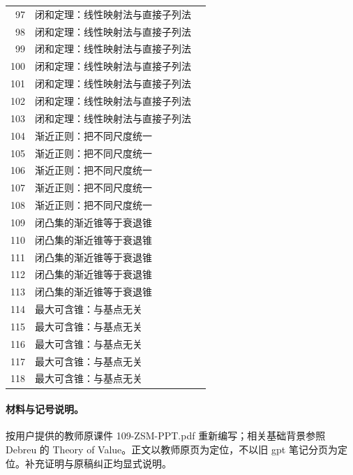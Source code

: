 \documentclass[11pt,a4paper]{article}
\theoremstyle{definition}\newtheorem{definition}{定义}\newtheorem{example}{例}
\begin{document}
\begin{longtable}{r p{.66\linewidth} r}
97 & 闭和定理：线性映射法与直接子列法 & \pageref{g:109:97}\\

98 & 闭和定理：线性映射法与直接子列法 & \pageref{g:109:97}\\

99 & 闭和定理：线性映射法与直接子列法 & \pageref{g:109:97}\\

100 & 闭和定理：线性映射法与直接子列法 & \pageref{g:109:97}\\

101 & 闭和定理：线性映射法与直接子列法 & \pageref{g:109:97}\\

102 & 闭和定理：线性映射法与直接子列法 & \pageref{g:109:97}\\

103 & 闭和定理：线性映射法与直接子列法 & \pageref{g:109:97}\\

104 & 渐近正则：把不同尺度统一 & \pageref{g:109:104}\\

105 & 渐近正则：把不同尺度统一 & \pageref{g:109:104}\\

106 & 渐近正则：把不同尺度统一 & \pageref{g:109:104}\\

107 & 渐近正则：把不同尺度统一 & \pageref{g:109:104}\\

108 & 渐近正则：把不同尺度统一 & \pageref{g:109:104}\\

109 & 闭凸集的渐近锥等于衰退锥 & \pageref{g:109:109}\\

110 & 闭凸集的渐近锥等于衰退锥 & \pageref{g:109:109}\\

111 & 闭凸集的渐近锥等于衰退锥 & \pageref{g:109:109}\\

112 & 闭凸集的渐近锥等于衰退锥 & \pageref{g:109:109}\\

113 & 闭凸集的渐近锥等于衰退锥 & \pageref{g:109:109}\\

114 & 最大可含锥：与基点无关 & \pageref{g:109:114}\\

115 & 最大可含锥：与基点无关 & \pageref{g:109:114}\\

116 & 最大可含锥：与基点无关 & \pageref{g:109:114}\\

117 & 最大可含锥：与基点无关 & \pageref{g:109:114}\\

118 & 最大可含锥：与基点无关 & \pageref{g:109:114}\\

\bottomrule\end{longtable}

\paragraph{材料与记号说明。}按用户提供的教师原课件 109-ZSM-PPT.pdf 重新编写；相关基础背景参照 Debreu 的 Theory of Value。正文以教师原页为定位，不以旧 gpt 笔记分页为定位。补充证明与原稿纠正均显式说明。
\end{document}
